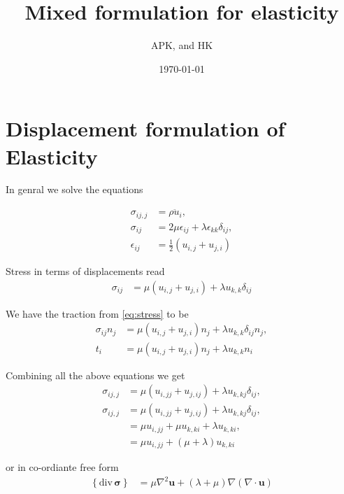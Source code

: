\documentclass[11pt,a4paper]{article}
\title{Mixed formulation for elasticity}
\author{APK, and HK}
\date{\today}
\theoremstyle{plain}
\theoremstyle{definition}
\theoremstyle{remark}
\newcommand{\pr}[1]{\left(#1\right)}
\newcommand{\gp}[1]{\left\{#1\right\}}
\renewcommand{\u}[1]{\boldsymbol{#1}}
\begin{document}
\maketitle
\tableofcontents


\section{Displacement formulation of Elasticity}
In genral we solve the equations 

\begin{subequations}
\begin{align}
\sigma_{ij,j}&=\rho \ddot{u}_i,\\
\sigma_{ij}&=2\mu \epsilon_{ij}+\lambda \epsilon_{kk}\delta_{ij},\\
\epsilon_{ij}&=\frac{1}{2}\pr{u_{i,j}+u_{j,i}}
\end{align}
\end{subequations}

Stress in terms of displacements read
\begin{align}
\sigma_{ij}&=\mu \pr{u_{i,j}+u_{j,i}}+\lambda u_{k,k}\delta_{ij}
\label{eq:stress}
\end{align}

We have the traction from \eqref{eq:stress} to be 
\begin{align}
\sigma_{ij}n_j&=\mu \pr{u_{i,j}+u_{j,i}}n_j+\lambda u_{k,k}\delta_{ij}n_j,\\
t_{i}&=\mu \pr{u_{i,j}+u_{j,i}}n_j+\lambda u_{k,k}n_i
\end{align}

Combining all the above equations we get
\begin{subequations}
\begin{align}
 \sigma_{ij,j}&=\mu \pr{u_{i,jj}+u_{j,ij}}+\lambda u_{k,kj}\delta_{ij},\\
 \sigma_{ij,j}&=\mu \pr{u_{i,jj}+u_{j,ij}}+\lambda u_{k,kj}\delta_{ij},\\
 &=\mu u_{i,jj}+\mu u_{k,ki}+\lambda u_{k,ki},\\
 &=\mu u_{i,jj}+\pr{\mu+\lambda} u_{k,ki}
  \label{eq:helmholtz}
\end{align}
\end{subequations}

or in co-ordiante free form
\begin{align}
\gp{\text{div}\, \u\sigma}&=\mu \nabla^2 \u{u}+\pr{\lambda+\mu}\nabla\pr{\nabla \cdot \u{u}} 
\end{align}
\end{document}

